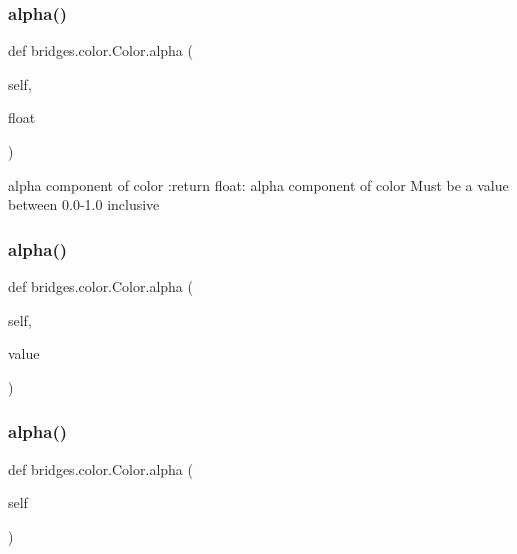 \subsubsection{\texorpdfstring{alpha()}{alpha()}\hspace{0.1cm}{\footnotesize\ttfamily [1/3]}}
{\footnotesize\ttfamily def bridges.\+color.\+Color.\+alpha (\begin{DoxyParamCaption}\item[{}]{self,  }\item[{}]{float }\end{DoxyParamCaption})}

\begin{DoxyVerb}alpha component of color
:return float: alpha component of color
Must be a value between 0.0-1.0 inclusive
\end{DoxyVerb}
 \mbox{\label{classbridges_1_1color_1_1_color_ab57c1e881ebb14bccefb870a9fa2ac1d}} 
\subsubsection{\texorpdfstring{alpha()}{alpha()}\hspace{0.1cm}{\footnotesize\ttfamily [2/3]}}
{\footnotesize\ttfamily def bridges.\+color.\+Color.\+alpha (\begin{DoxyParamCaption}\item[{}]{self,  }\item[{}]{value }\end{DoxyParamCaption})}

\mbox{\label{classbridges_1_1color_1_1_color_ae5dc631fcda27156867b21109620ae21}} 
\subsubsection{\texorpdfstring{alpha()}{alpha()}\hspace{0.1cm}{\footnotesize\ttfamily [3/3]}}
{\footnotesize\ttfamily def bridges.\+color.\+Color.\+alpha (\begin{DoxyParamCaption}\item[{}]{self }\end{DoxyParamCaption})}

